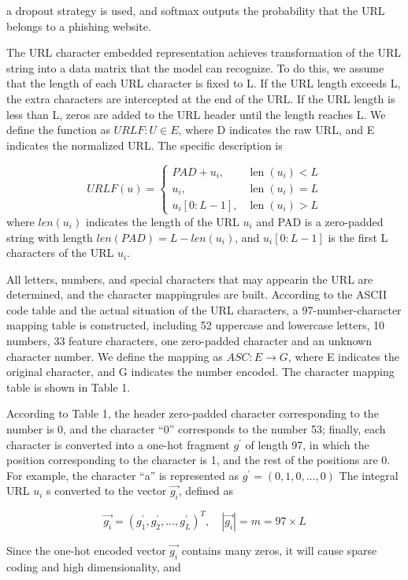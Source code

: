 \documentclass{ieeeaccess}
\begin{document}
a dropout strategy is used, and softmax outputs the probability
that the URL belongs to a phishing website.\par
The URL character embedded representation achieves
transformation of the URL string into a data matrix that the
model can recognize. To do this, we assume that the length
of each URL character is fixed to L. If the URL length
exceeds L, the extra characters are intercepted at the end of
the URL. If the URL length is less than L, zeros are added
to the URL header until the length reaches L. We define the
function as $URLF : U {\in} E$, where D indicates the raw URL,
and E indicates the normalized URL. The specific description
is \par
\begin{equation}
U R L F(u)=\left\{\begin{array}{ll}{P A D+u_{i},} & {\operatorname{len}\left(u_{i}\right)<L} \\ {u_{i},} & {\operatorname{len}\left(u_{i}\right)=L} \\ {u_{i}[0: L-1],} & {\operatorname{len}\left(u_{i}\right)>L}\end{array}\right.
\end{equation}
where $len(u_{i})$ indicates the length of the URL $u_{i}$ and PAD is
a zero-padded string with length $len (PAD) = L- len(u_{i})$, and $u_{i}[0:L-1]$ is the first L characters of the URL $u_{i}$. \par All letters, numbers, and special characters that may appearin the URL are determined, and the character mappingrules are built. According to the ASCII code table and the
actual situation of the URL characters, a 97-number-character
mapping table is constructed, including 52 uppercase and
lowercase letters, 10 numbers, 33 feature characters, one
zero-padded character and an unknown character number.
We define the mapping as $ASC : E {\rightarrow} G$, where E indicates
the original character, and G indicates the number encoded.
The character mapping table is shown in Table 1.\par According to Table 1, the header zero-padded character corresponding to the number is 0, and the character ``0'' corresponds to the number 53; finally, each character is converted
into a one-hot fragment $g^{\prime}$ of length 97, in which the position corresponding to the character is 1, and the rest of the positions are 0. For example, the character ``a'' is represented as $g^{\prime}=(0,1,0, \ldots, 0)$ The integral URL $u_{i}$ s converted to the vector $\overrightarrow{g_{i}}$, defined as \par \begin{equation}
\overrightarrow{g_{i}}=\left(g_{1}^{\prime}, g_{2}^{\prime}, \ldots, g_{L}^{\prime}\right)^{T}, \quad|\overrightarrow{g_{i}}|=m=97 \times L
\end{equation} \par Since the one-hot encoded vector $\overrightarrow{g_{i}}$ contains many zeros, it will cause sparse coding and high dimensionality, and
\end{document}
